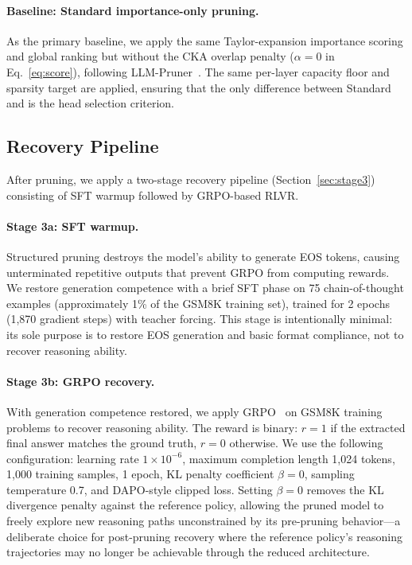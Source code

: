 \paragraph{Baseline: Standard importance-only pruning.}
As the primary baseline, we apply the same Taylor-expansion importance scoring and global ranking but without the CKA overlap penalty ($\alpha{=}0$ in Eq.~\ref{eq:score}), following LLM-Pruner~\citep{llmpruner2023}.
The same per-layer capacity floor and sparsity target are applied, ensuring that the only difference between Standard and \rasp{} is the head selection criterion.

\subsection{Recovery Pipeline}
\label{sec:recovery_pipeline}

After pruning, we apply a two-stage recovery pipeline (Section~\ref{sec:stage3}) consisting of SFT warmup followed by GRPO-based RLVR.

\paragraph{Stage 3a: SFT warmup.}
Structured pruning destroys the model's ability to generate EOS tokens, causing unterminated repetitive outputs that prevent GRPO from computing rewards.
We restore generation competence with a brief SFT phase on 75 chain-of-thought examples (approximately 1\% of the GSM8K training set), trained for 2 epochs (1{,}870 gradient steps) with teacher forcing.
This stage is intentionally minimal: its sole purpose is to restore EOS generation and basic format compliance, not to recover reasoning ability.

\paragraph{Stage 3b: GRPO recovery.}
With generation competence restored, we apply GRPO~\citep{shao2024grpo} on GSM8K training problems to recover reasoning ability.
The reward is binary: $r{=}1$ if the extracted final answer matches the ground truth, $r{=}0$ otherwise.
We use the following configuration: learning rate $1{\times}10^{-6}$, maximum completion length 1{,}024 tokens, 1{,}000 training samples, 1 epoch, KL penalty coefficient $\beta{=}0$, sampling temperature 0.7, and DAPO-style clipped loss.
Setting $\beta{=}0$ removes the KL divergence penalty against the reference policy, allowing the pruned model to freely explore new reasoning paths unconstrained by its pre-pruning behavior---a deliberate choice for post-pruning recovery where the reference policy's reasoning trajectories may no longer be achievable through the reduced architecture.

